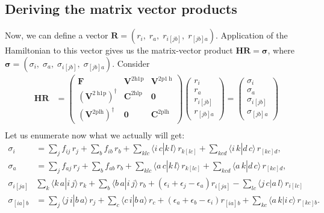 \subsection{Deriving the matrix vector products}
Now, we can define a vector $\bm{R} = ( r_i,\; r_a,\; r_{i[jb]},\; r_{[jb]a} )$. Application of the Hamiltonian to this vector gives us the matrix-vector product $\bm{H} \bm{R} = \bm{\sigma }$, where $\bm{\sigma} = ( \sigma_i,\; \sigma_a,\; \sigma_{i[jb]},\; \sigma_{[jb]a} )$. Consider
\begin{align}
\bm{H} \bm{R} &= \begin{pmatrix} \bm{F} & \bm{V}^{2 \mathrm{h1p}} & \bm{V}^{2 \mathrm{p} 1 \mathrm{~h}} \\ \left(\bm{V}^{2 \mathrm{~h} 1 \mathrm{p}}\right)^{\dagger} & \bm{C}^{2 \mathrm{hlp}} & \bm{0} \\ \left(\bm{V}^{2 \mathrm{plh}}\right)^{\dagger} & \bm{0} & \bm{C}^{2 \mathrm{plh}} \end{pmatrix} \begin{pmatrix} r_i \\ r_a \\ r_{i[jb]} \\ r_{[jb]a} \end{pmatrix} = \begin{pmatrix} \sigma_i \\ \sigma_a \\ \sigma_{i[jb]} \\ \sigma_{[jb]a} \end{pmatrix} \\[6pt]
\end{align}
Let us enumerate now what we actually will get:
\begin{align}
\sigma_i &= 
  \sum_{j} f_{i j}\,r_j
  + \sum_{b} f_{i b}\,r_b
  + \sum_{k l c} \bigl\langle i\,c | k\,l \bigr\rangle\,r_{k[l c]}
  + \sum_{k c d} \bigl\langle i\,k | d\,c \bigr\rangle\,r_{[k c]d}, \\[6pt]
\sigma_a &=
    \sum_{j} f_{a j}\,r_j
    + \sum_{b} f_{a b}\,r_b
    + \sum_{k l c} \bigl\langle a\,c | k\,l \bigr\rangle\,r_{k[l c]}
    + \sum_{k c d} \bigl\langle a\,k | d\,c \bigr\rangle\,r_{[k c]d}, \\[6pt]
\sigma_{i[ja]} &
    \sum_{k} \bigl\langle k\,a | i\,j \bigr\rangle\,r_k
    + \sum_{b} \bigl\langle b\,a | i\,j \bigr\rangle\,r_b
    + \left(\epsilon _{i} + \epsilon _{j} - \epsilon _{a}\right) r_{i[j a]}
    - \sum_{lc} \bigl\langle j\,c | a\,l \bigr\rangle\,r_{i[l c]} \\[6pt]
\sigma_{[ia]b} &= 
    \sum_{j} \bigl\langle j\,i | b\,a \bigr\rangle\,r_j
    + \sum_{c} \bigl\langle c\,i | b\,a \bigr\rangle\,r_c
    + \left(\epsilon _{a} + \epsilon _{b} - \epsilon _{i}\right) r_{[i a] b}
    + \sum_{k c} \bigl\langle a\,k | i\,c \bigr\rangle\,r_{[k c] b}.
\end{align}
